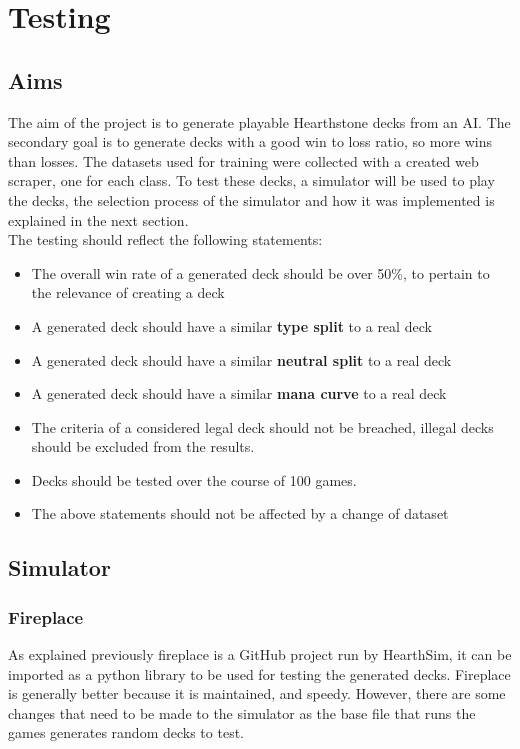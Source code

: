 \documentclass{report} %
\begin{document}
\chapter{Testing}
\section{Aims}
The aim of the project is to generate playable Hearthstone decks from an AI. The secondary goal is to generate decks with a good win to loss ratio, so more wins than losses. The datasets used for training were collected with a created web scraper, one for each class. To test these decks, a simulator will be used to play the decks, the selection process of the simulator and how it was implemented is explained in the next section.\\
The testing should reflect the following statements:
\begin{itemize}
\item The overall win rate of a generated deck should be over 50\%, to pertain to the relevance of creating a deck
\item A generated deck should have a similar \textbf{type split} to a real deck
\item A generated deck should have a similar \textbf{neutral split} to a real deck
\item A generated deck should have a similar \textbf{mana curve} to a real deck
\item The criteria of a considered legal deck should not be breached, illegal decks should be excluded from the results.
\item Decks should be tested over the course of 100 games.
\item The above statements should not be affected by a change of dataset
\end{itemize}
\section{Simulator}
\subsection{Fireplace}
As explained previously fireplace is a GitHub project run by HearthSim, it can be imported as a python library to be used for testing the generated decks. Fireplace is generally better because it is maintained, and speedy. However, there are some changes that need to be made to the simulator as the base file that runs the games generates random decks to test.
\end{document}
